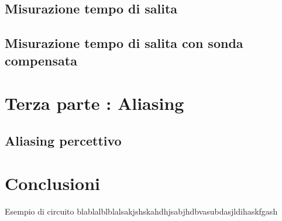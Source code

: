 \documentclass{article}
\begin{document}
\subsection{Misurazione tempo di salita}
\subsection{Misurazione tempo di salita con sonda compensata}

\section{Terza parte : Aliasing}
\subsection{Aliasing percettivo}
    
\section{Conclusioni}
    Esempio di circuito blablalblblalsakjshskahdhjsabjhdbvasubdasjldihaskfgash
    
    
\end{document}
